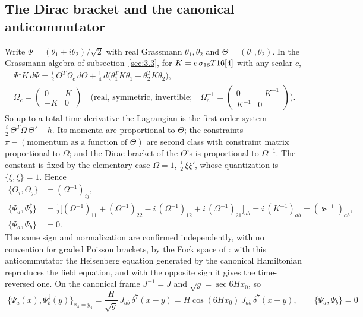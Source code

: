 \subsection{The Dirac bracket and the canonical anticommutator}
\label{sec:6.3}

Write $\Psi=(\theta_1+i\theta_2)/\sqrt2$ with real Grassmann $\theta_1,\theta_2$ and
$\Theta=(\theta_1,\theta_2)$. In the Grassmann algebra of subsection~\ref{sec:3.3}, for
$K=c\,\sigma_{16}T16[4]$ with any scalar $c$,
\begin{gather*}
  \Psi^{\ddagger}K\,d\Psi=\frac{i}{2}\,\Theta^{T}\Omega_c\,d\Theta+\frac14\,d\bigl(\theta_1^{T}K\theta_1+\theta_2^{T}K\theta_2\bigr),\\
  \Omega_c=\begin{pmatrix}0&K\\-K&0\end{pmatrix}\quad\text{(real, symmetric, invertible;}\quad
  \Omega_c^{-1}=\begin{pmatrix}0&-K^{-1}\\K^{-1}&0\end{pmatrix}\text{)} .
\end{gather*}
So up to a total time derivative the Lagrangian is the first-order system
$\frac{i}{2}\,\Theta^{T}\Omega\,\Theta'-h$. Its momenta are proportional to $\Theta$; the constraints
$\pi-(\text{momentum as a function of }\Theta)$ are second class with constraint matrix proportional
to $\Omega$; and the Dirac bracket of the $\Theta$'s is proportional to $\Omega^{-1}$. The constant is
fixed by the elementary case $\Omega=1$, $\frac{i}{2}\,\xi\xi'$, whose quantization is $\{\xi,\xi\}=1$.
Hence
\begin{align*}
  \{\Theta_i,\Theta_j\}&=(\Omega^{-1})_{ij},\\
  \{\Psi_a,\Psi^{\ddagger}_b\}&=\tfrac12\bigl[(\Omega^{-1})_{11}+(\Omega^{-1})_{22}-i\,(\Omega^{-1})_{12}+i\,(\Omega^{-1})_{21}\bigr]_{ab}
    =i\,(K^{-1})_{ab}=(\Gt^{-1})_{ab},\\
  \{\Psi_a,\Psi_b\}&=0 .
\end{align*}
The same sign and normalization are confirmed independently, with no convention for graded Poisson
brackets, by the Fock space of : with this anticommutator the Heisenberg equation
generated by the canonical Hamiltonian reproduces the field equation, and with the opposite sign it
gives the time-reversed one. On the canonical frame $J^{-1}=J$ and $\sqrt g=\sec 6Hx_0$, so
\[
  \boxed{\;\{\Psi_a(x),\Psi^{\ddagger}_b(y)\}_{x_4=y_4}=\frac{H}{\sqrt g}\,J_{ab}\,\delta^7(x-y)=H\cos(6Hx_0)\,J_{ab}\,\delta^7(x-y),
  \qquad\{\Psi_a,\Psi_b\}=0\;}
\]
